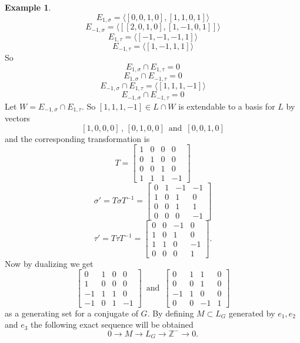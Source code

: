 \documentclass{article}
\theoremstyle{plain}
\theoremstyle{definition}
\newtheorem{example}[theorem]{Example}
\newcommand{\Z}{\ensuremath{\mathbb{Z}}}
\newcommand{\tand}{\ensuremath{\,\,\, \text{and} \,\,\,}}
\begin{document}
\begin{example}
$$E_{1,\sigma} =\langle [ 0, 0, 1, 0 ], [ 1, 1, 0, 1 ] \rangle $$
$$E_{-1,\sigma} =\langle [ [ 2, 0, 1, 0 ], [ 1, -1, 0, 1 ] ] \rangle $$
$$E_{1,\tau} =\langle [ -1, -1, -1, 1 ]  \rangle $$
$$E_{-1,\tau} =\langle [ 1, -1, 1, 1 ]\rangle $$
So 
$$ E_{1,\sigma} \cap E_{1,\tau}= {0} $$
$$ E_{1,\sigma} \cap E_{-1,\tau}= {0} $$
$$ E_{-1,\sigma} \cap E_{1,\tau}= \langle [ 1, 1, 1, -1 ] \rangle $$
$$ E_{-1,\sigma} \cap E_{-1,\tau}= {0} $$
Let $W = E_{-1,\sigma} \cap E_{1,\tau}.$ So $[ 1, 1, 1, -1 ] \in L \cap W$ is extendable to a basis for $L$ by vectors 
$$[ 1, 0, 0, 0 ] \, , \, [ 0,1,0,0 ] \tand [ 0,0,1,0] $$
and the corresponding transformation is 
$$
T = \begin{bmatrix}
1 & 0 & 0 & 0\\
0 & 1 & 0 & 0\\
0 & 0 & 1 & 0\\
1 & 1 & 1 & -1
\end{bmatrix}
$$
$$
\sigma' = T\sigma T^{-1} = \left[ \begin {array}{cccc} 0&1&-1&-1\\ 1&0&1&0
\\ 0&0&1&1\\ 0&0&0&-1\end {array}
 \right] 
$$
$$
\tau' = T \tau T^{-1} =\left[ \begin {array}{cccc} 0&0&-1&0\\ 1&0&1&0
\\ 1&1&0&-1\\ 0&0&0&1\end {array}
 \right].
$$
Now by dualizing we get 
$$
 \left[ \begin {array}{ccc|c} 0&1&0&0\\ 1&0&0&0
\\ -1&1&1&0\\ \hline -1&0&1&-1
\end {array} \right]
 \tand 
 \left[ \begin {array}{ccc|c} 0&1&1&0\\ 0&0&1&0
\\ -1&1&0&0\\ \hline 0&0&-1&1\end {array}
 \right] 
$$ 
as a generating set for a conjugate of $G$. By defining $M\subset L_G$ generated by $e_1, e_2$ and $e_3$ the following exact sequence will be obtained
$$0 \longrightarrow M \longrightarrow L_G \longrightarrow \Z^- \longrightarrow 0.$$
\end{example}
\end{document}
